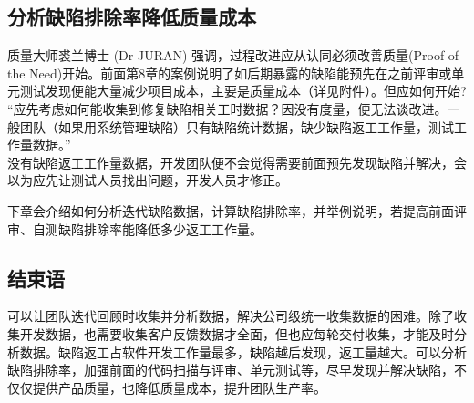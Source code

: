 
\hypertarget{ux5206ux6790ux7f3aux9677ux6392ux9664ux7387ux964dux4f4eux8d28ux91cfux6210ux672c}{%
\subsection{分析缺陷排除率降低质量成本}\label{ux5206ux6790ux7f3aux9677ux6392ux9664ux7387ux964dux4f4eux8d28ux91cfux6210ux672c}}

质量大师裘兰博士 (Dr JURAN) 强调，过程改进应从认同必须改善质量(Proof of the Need)开始。前面第8章的案例说明了如后期暴露的缺陷能预先在之前评审或单元测试发现便能大量减少项目成本，主要是质量成本（详见附件）。但应如何开始? \\





“应先考虑如何能收集到修复缺陷相关工时数据？因没有度量，便无法谈改进。一般团队（如果用系统管理缺陷）只有缺陷统计数据，缺少缺陷返工工作量，测试工作量数据。”\\

没有缺陷返工工作量数据，开发团队便不会觉得需要前面预先发现缺陷并解决，会以为应先让测试人员找出问题，开发人员才修正。

下章会介绍如何分析迭代缺陷数据，计算缺陷排除率，并举例说明，若提高前面评审、自测缺陷排除率能降低多少返工工作量。


\hypertarget{ux7ed3ux675fux8bed}{%
\subsection{结束语}\label{ux7ed3ux675fux8bed}}

可以让团队迭代回顾时收集并分析数据，解决公司级统一收集数据的困难。除了收集开发数据，也需要收集客户反馈数据才全面，但也应每轮交付收集，才能及时分析数据。缺陷返工占软件开发工作量最多，缺陷越后发现，返工量越大。可以分析缺陷排除率，加强前面的代码扫描与评审、单元测试等，尽早发现并解决缺陷，不仅仅提供产品质量，也降低质量成本，提升团队生产率。

